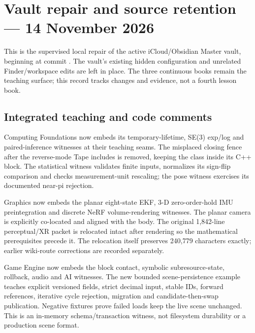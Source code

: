 \hypertarget{appendix-faa2b5a8e820}{}\label{referencestart:appendix-faa2b5a8e820}
\section{Vault repair and source retention --- 14 November 2026}\label{appendix-faa2b5a8e820-vault-repair-and-source-retention-14-november-2026}

\hypertarget{appendix-faa2b5a8e820-vault-repair-and-source-retention-14-november-2026}{}

This is the supervised local repair of the active iCloud/Obsidian Master vault, beginning at commit . The vault's existing hidden  configuration and unrelated Finder/workspace edits are left in place. The three continuous books remain the teaching surface; this record tracks changes and evidence, not a fourth lesson book.

\subsection{Integrated teaching and code comments}\label{appendix-faa2b5a8e820-integrated-teaching-and-code-comments}

\hypertarget{appendix-faa2b5a8e820-integrated-teaching-and-code-comments}{}

Computing Foundations now embeds its temporary-lifetime, SE(3) exp/log and paired-inference witnesses at their teaching seams. The misplaced closing fence after the reverse-mode Tape includes is removed, keeping the class inside its C++ block. The statistical witness validates finite inputs, normalizes its sign-flip comparison and checks measurement-unit rescaling; the pose witness exercises its documented near-pi rejection.

Graphics now embeds the planar eight-state EKF, 3-D zero-order-hold IMU preintegration and discrete NeRF volume-rendering witnesses. The planar camera is explicitly co-located and aligned with the body. The original 1,842-line perceptual/XR packet is relocated intact after rendering so the mathematical prerequisites precede it. The relocation itself preserves 240,779 characters exactly; earlier wiki-route corrections are recorded separately.

Game Engine now embeds the block contact, symbolic subresource-state, rollback, audio and AI witnesses. The new bounded scene-persistence example teaches explicit versioned fields, strict decimal input, stable IDs, forward references, iterative cycle rejection, migration and candidate-then-swap publication. Negative fixtures prove failed loads keep the live scene unchanged. This is an in-memory schema/transaction witness, not filesystem durability or a production scene format.

